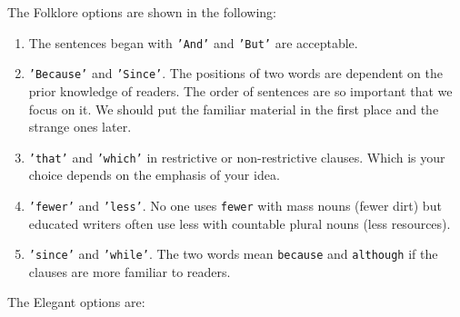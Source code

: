 The Folklore options are shown in the following:
\begin{enumerate}
\item The sentences began with \texttt{'And'} and \texttt{'But'} are acceptable.
\item \texttt{'Because'} and \texttt{'Since'}. The positions of two words are dependent on the prior knowledge of readers. The order of sentences are so important that we focus on it. We should put the familiar material in the first place and the strange ones later.
\item \texttt{'that'} and \texttt{'which'} in restrictive or non-restrictive clauses. Which is your choice depends on the emphasis of your idea. 
\item \texttt{'fewer'} and \texttt{'less'}. No one uses \texttt{fewer} with mass nouns (fewer dirt) but educated writers often use less with countable plural nouns (less resources).
\item \texttt{'since'} and \texttt{'while'}. The two words mean \texttt{because} and \texttt{although} if the clauses are more familiar to readers.  
\end{enumerate}
The Elegant options are:
